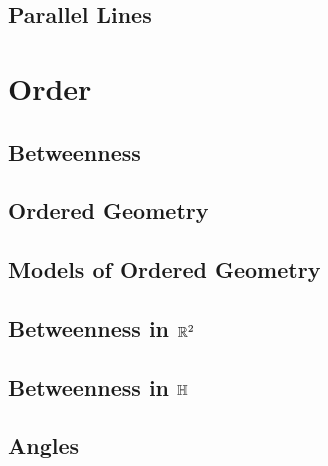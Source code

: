 \documentclass{memoir}
\begin{document}

  \section{Parallel Lines}
    
    \newpage


\chapter{Order}
\newpage

  \section{Betweenness}
    
    \newpage

  \section{Ordered Geometry}
    
    \newpage

  \section{Models of Ordered Geometry}
    
    \newpage

  \section{Betweenness in \(\mathbb{R}^2\)}
    
    \newpage

  \section{Betweenness in \(\mathbb{H}\)}
    
    \newpage

  \section{Angles}
    
    \newpage
\end{document}
